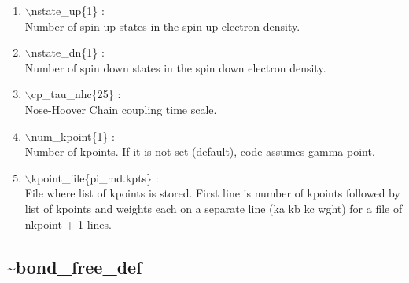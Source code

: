 \documentclass[12pt,titlepage]{article}
\begin{document}
\begin{enumerate}

 \vspace{0.15in} 
 \item  $\backslash$nstate\_up\{1\} : \\ 
     Number of spin up states in the spin up electron density.

 \vspace{0.15in} 
 \item  $\backslash$nstate\_dn\{1\} : \\
     Number of spin down states in the spin down electron density.

 \vspace{0.15in} 
 \item  $\backslash$cp\_tau\_nhc\{25\} : \\
     Nose-Hoover Chain coupling time scale.

 \vspace{0.15in} 
 \item  $\backslash$num\_kpoint\{1\} : \\
  Number of kpoints. If it is not set (default), code assumes gamma point.

 \vspace{0.15in} 
 \item  $\backslash$kpoint\_file\{pi\_md.kpts\} : \\
 File where list of kpoints is stored. First line is number of kpoints followed
by list of kpoints and weights each on a separate line (ka kb kc  wght) for a 
file of nkpoint + 1 lines.

\end{enumerate}

\newpage
\subsection*{\bf \~{}bond\_free\_def}
\end{document}
